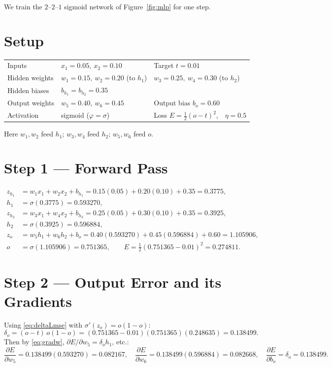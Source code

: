 \documentclass[11pt,a4paper]{report}
\theoremstyle{definition}
\theoremstyle{remark}
\newcommand{\pd}[2]{\frac{\partial #1}{\partial #2}}
\begin{document}
We train the $2$--$2$--$1$ sigmoid network of Figure~\ref{fig:mlp} for one step.

\section{Setup}
\begin{center}
\begin{tabular}{@{}lll@{}}
\toprule
Inputs & $x_1=0.05,\ x_2=0.10$ & Target $t=0.01$\\
Hidden weights & $w_1=0.15,\ w_2=0.20$ (to $h_1$) & $w_3=0.25,\ w_4=0.30$ (to $h_2$)\\
Hidden biases & $b_{h_1}=b_{h_2}=0.35$ &\\
Output weights & $w_5=0.40,\ w_6=0.45$ & Output bias $b_o=0.60$\\
Activation & sigmoid ($\varphi=\sigma$) & Loss $E=\tfrac12(o-t)^2$,\ \ $\eta=0.5$\\
\bottomrule
\end{tabular}
\end{center}
Here $w_1,w_2$ feed $h_1$; $w_3,w_4$ feed $h_2$; $w_5,w_6$ feed $o$.

\section{Step 1 --- Forward Pass}
\begin{align*}
z_{h_1}&=w_1x_1+w_2x_2+b_{h_1}=0.15(0.05)+0.20(0.10)+0.35=0.3775,\\
h_1&=\sigma(0.3775)=0.593270,\\
z_{h_2}&=w_3x_1+w_4x_2+b_{h_2}=0.25(0.05)+0.30(0.10)+0.35=0.3925,\\
h_2&=\sigma(0.3925)=0.596884,\\
z_{o}&=w_5h_1+w_6h_2+b_o=0.40(0.593270)+0.45(0.596884)+0.60=1.105906,\\
o&=\sigma(1.105906)=0.751365,\qquad
E=\tfrac12(0.751365-0.01)^2=0.274811.
\end{align*}

\section{Step 2 --- Output Error and its Gradients}
Using \eqref{eq:deltaLmse} with $\sigma'(z_o)=o(1-o)$:
\[
\delta_o=(o-t)\,o(1-o)=(0.751365-0.01)(0.751365)(0.248635)=0.138499.
\]
Then by \eqref{eq:gradw}, $\partial E/\partial w_5=\delta_o h_1$, etc.:
\[
\pd{E}{w_5}=0.138499(0.593270)=0.082167,\quad
\pd{E}{w_6}=0.138499(0.596884)=0.082668,\quad
\pd{E}{b_o}=\delta_o=0.138499.
\]
\end{document}
